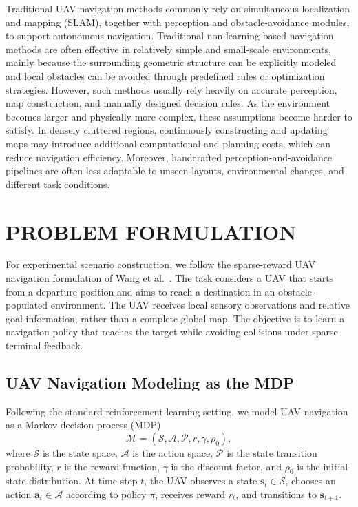 \documentclass{article}
\begin{document}
Traditional UAV navigation methods commonly rely on simultaneous localization and mapping (SLAM), together with perception and obstacle-avoidance modules, to support autonomous navigation. Traditional non-learning-based navigation methods are often effective in relatively simple and small-scale environments, mainly because the surrounding geometric structure can be explicitly modeled and local obstacles can be avoided through predefined rules or optimization strategies. However, such methods usually rely heavily on accurate perception, map construction, and manually designed decision rules. As the environment becomes larger and physically more complex, these assumptions become harder to satisfy. In densely cluttered regions, continuously constructing and updating maps may introduce additional computational and planning costs, which can reduce navigation efficiency. Moreover, handcrafted perception-and-avoidance pipelines are often less adaptable to unseen layouts, environmental changes, and different task conditions.

\section{PROBLEM FORMULATION}

For experimental scenario construction, we follow the sparse-reward UAV navigation formulation of Wang et al.~\cite{wang2020deep}. The task considers a UAV that starts from a departure position and aims to reach a destination in an obstacle-populated environment. The UAV receives local sensory observations and relative goal information, rather than a complete global map. The objective is to learn a navigation policy that reaches the target while avoiding collisions under sparse terminal feedback.

\subsection{UAV Navigation Modeling as the MDP}

Following the standard reinforcement learning setting, we model UAV navigation as a Markov decision process (MDP)
\begin{equation}
\mathcal M
=
(\mathcal S,\mathcal A,\mathcal P,r,\gamma,\rho_0),
\label{eq:uav_mdp_tuple}
\end{equation}
where $\mathcal S$ is the state space, $\mathcal A$ is the action space, $\mathcal P$ is the state transition probability, $r$ is the reward function, $\gamma$ is the discount factor, and $\rho_0$ is the initial-state distribution. At time step $t$, the UAV observes a state $\mathbf s_t\in\mathcal S$, chooses an action $\mathbf a_t\in\mathcal A$ according to policy $\pi$, receives reward $r_t$, and transitions to $\mathbf s_{t+1}$.
\end{document}
